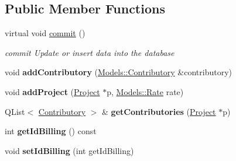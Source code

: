 \subsection*{Public Member Functions}
\begin{DoxyCompactItemize}
\item 
\hypertarget{classModels_1_1ContributoriesList_ad341e0527f4c9057281400f6cf54e54f}{virtual void \hyperlink{classModels_1_1ContributoriesList_ad341e0527f4c9057281400f6cf54e54f}{commit} ()}\label{classModels_1_1ContributoriesList_ad341e0527f4c9057281400f6cf54e54f}

\begin{DoxyCompactList}\small\item\em commit Update or insert data into the database \end{DoxyCompactList}\item 
\hypertarget{classModels_1_1ContributoriesList_a62b01d5292326da5902589ddb9b71234}{void {\bfseries add\-Contributory} (\hyperlink{classModels_1_1Contributory}{Models\-::\-Contributory} \&contributory)}\label{classModels_1_1ContributoriesList_a62b01d5292326da5902589ddb9b71234}

\item 
\hypertarget{classModels_1_1ContributoriesList_a4c99c890fc7d7616678d6e5f7ee558f5}{void {\bfseries add\-Project} (\hyperlink{classModels_1_1Project}{Project} $\ast$p, \hyperlink{classModels_1_1Rate}{Models\-::\-Rate} rate)}\label{classModels_1_1ContributoriesList_a4c99c890fc7d7616678d6e5f7ee558f5}

\item 
\hypertarget{classModels_1_1ContributoriesList_a2549547fd3866d879ebbfd1f38145fc5}{Q\-List$<$ \hyperlink{classModels_1_1Contributory}{Contributory} $>$ \& {\bfseries get\-Contributories} (\hyperlink{classModels_1_1Project}{Project} $\ast$p)}\label{classModels_1_1ContributoriesList_a2549547fd3866d879ebbfd1f38145fc5}

\item 
\hypertarget{classModels_1_1ContributoriesList_a3fbbce49ffcdbfa0693f4d21dd0d8c14}{int {\bfseries get\-Id\-Billing} () const }\label{classModels_1_1ContributoriesList_a3fbbce49ffcdbfa0693f4d21dd0d8c14}

\item 
\hypertarget{classModels_1_1ContributoriesList_a759f76db48c3dfe88ab8bd534b835553}{void {\bfseries set\-Id\-Billing} (int get\-Id\-Billing)}\label{classModels_1_1ContributoriesList_a759f76db48c3dfe88ab8bd534b835553}


\end{DoxyCompactItemize}
